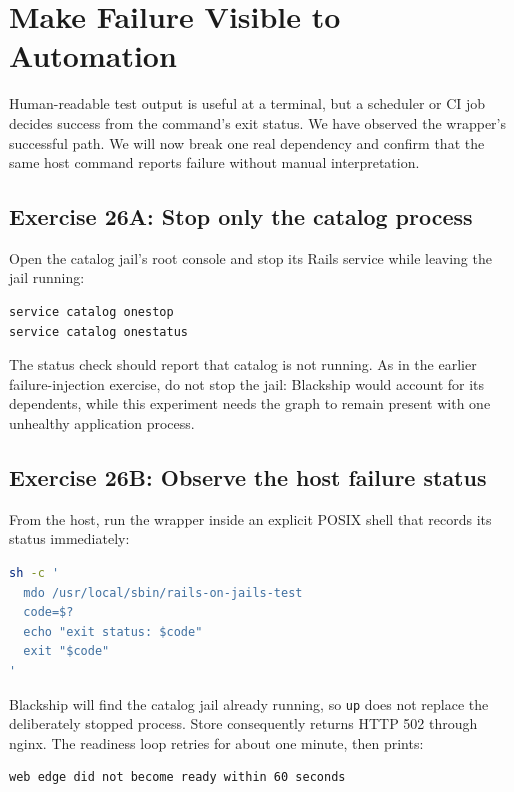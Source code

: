 \chapter{Make Failure Visible to Automation}

Human-readable test output is useful at a terminal, but a scheduler or CI job
decides success from the command's exit status. We have observed the wrapper's
successful path. We will now break one real dependency and confirm that the
same host command reports failure without manual interpretation.

\section{Exercise 26A: Stop only the catalog process}

Open the catalog jail's root console and stop its Rails service while leaving
the jail running:

\begin{lstlisting}[language=sh]
service catalog onestop
service catalog onestatus
\end{lstlisting}

The status check should report that catalog is not running. As in the earlier
failure-injection exercise, do not stop the jail: Blackship would account for
its dependents, while this experiment needs the graph to remain present with
one unhealthy application process.

\section{Exercise 26B: Observe the host failure status}

From the host, run the wrapper inside an explicit POSIX shell that records its
status immediately:

\begin{lstlisting}[language=sh]
sh -c '
  mdo /usr/local/sbin/rails-on-jails-test
  code=$?
  echo "exit status: $code"
  exit "$code"
'
\end{lstlisting}

Blackship will find the catalog jail already running, so \texttt{up} does not
replace the deliberately stopped process. Store consequently returns HTTP 502
through nginx. The readiness loop retries for about one minute, then prints:

\begin{lstlisting}
web edge did not become ready within 60 seconds
\end{lstlisting}

